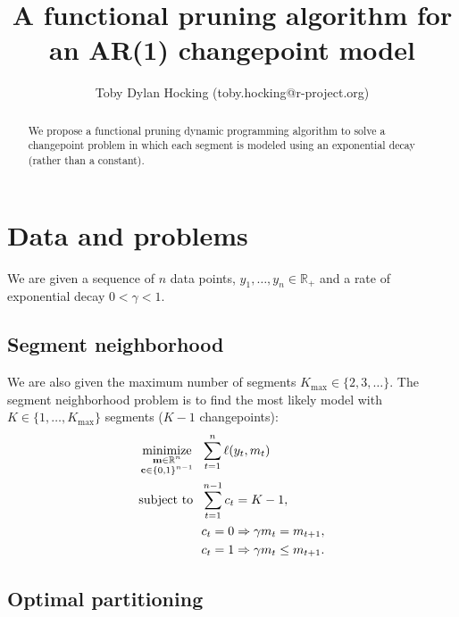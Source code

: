 \documentclass{article}
\DeclareMathOperator*{\minimize}{minimize}
\DeclareMathOperator*{\subjectto}{subject\ to}
\newcommand{\RR}{\mathbb R}
\begin{document}
\title{A functional pruning algorithm for an AR(1) changepoint model}
\author{
Toby Dylan Hocking (toby.hocking@r-project.org)
}
\maketitle

\begin{abstract}
  We propose a functional pruning dynamic programming algorithm to
  solve a changepoint problem in which each segment is modeled using
  an exponential decay (rather than a constant).
\end{abstract}

\section{Data and problems}

We are given a sequence of $n$ data points, $y_1,\dots,y_n\in\RR_+$
and a rate of exponential decay $0<\gamma<1$.

\subsection{Segment neighborhood}

We are also given the maximum number of segments
$K_{\text{max}}\in\{2,3, \dots\}$. The segment neighborhood problem is
to find the most likely model with $K\in\{1,\dots, K_{\text{max}}\}$
segments ($K-1$ changepoints):
\begin{align}
  \label{eq:segment-neighborhood}
  \minimize_{
    \substack{
    \mathbf m\in\RR^n\\
\mathbf c\in\{0,1\}^{n-1}
}
} &\ \ 
  \sum_{t=1}^n \ell(y_t, m_t)\\
\subjectto
 &\ \  \sum_{t=1}^{n-1} c_t = K-1,
  \nonumber\\
  &\ \  c_t=0 \Rightarrow \gamma m_t = m_{t+1},
  \nonumber\\
  &\ \  c_t=1 \Rightarrow \gamma m_t \leq m_{t+1}.
  \nonumber 
\end{align}

\subsection{Optimal partitioning}
\end{document}
